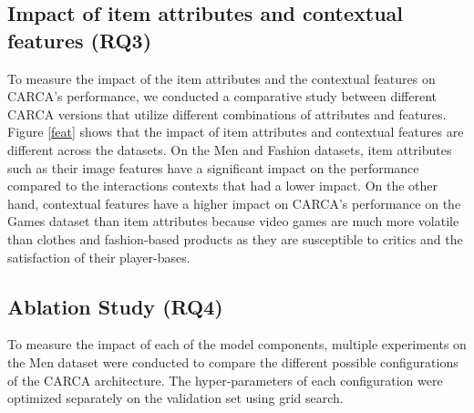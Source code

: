 \documentclass[sigconf,natbib=true]{acmart}
\begin{document}
\subsection{Impact of item attributes and contextual features (RQ3)}
To measure the impact of the item attributes and the contextual features on CARCA's performance, we conducted a comparative study between different CARCA versions that utilize different combinations of attributes and features. Figure \ref{feat} shows that the impact of item attributes and contextual features are different across the datasets. On the Men and Fashion datasets, item attributes such as their image features have a significant impact on the performance compared to the interactions contexts that had a lower impact. On the other hand, contextual features have a higher impact on CARCA's performance on the Games dataset than item attributes because video games are much more volatile than clothes and fashion-based products as they are susceptible to critics and the satisfaction of their player-bases.


\subsection{Ablation Study (RQ4)}
To measure the impact of each of the model components, multiple experiments on the Men dataset were conducted to compare the different possible configurations of the CARCA architecture. The hyper-parameters of each configuration were optimized separately on the validation set using grid search.
\end{document}
